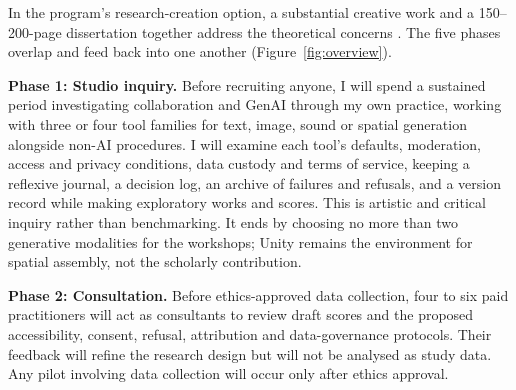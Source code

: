 \ifformalversion\else In the program's research-creation option, a
substantial creative work and a 150--200-page dissertation together address
the theoretical concerns \citep{comcult_rc}. \fi
The five phases overlap and feed back into one another
(Figure~\ref{fig:overview}).

\textbf{Phase 1: Studio inquiry.} Before recruiting anyone, I will spend a
sustained period investigating collaboration and GenAI through my own
practice, working with three or four tool families for text, image, sound or
spatial generation alongside non-AI procedures. I will examine each tool's
defaults, moderation, access and privacy conditions, data custody and terms
of service, keeping a reflexive journal, a decision log, an archive of
failures and refusals, and a version record while making exploratory works
and scores. This is artistic and critical inquiry
rather than benchmarking. It ends by choosing no more than two generative
modalities for the workshops; Unity remains the environment for spatial
assembly, not the scholarly contribution.

\textbf{Phase 2: Consultation.} Before ethics-approved data collection, four
to six paid practitioners will act as consultants to review draft scores and
the proposed accessibility, consent, refusal, attribution and
data-governance protocols. Their feedback will refine the research design
but will not be analysed as study data. Any pilot involving data collection
will occur only after ethics approval.

